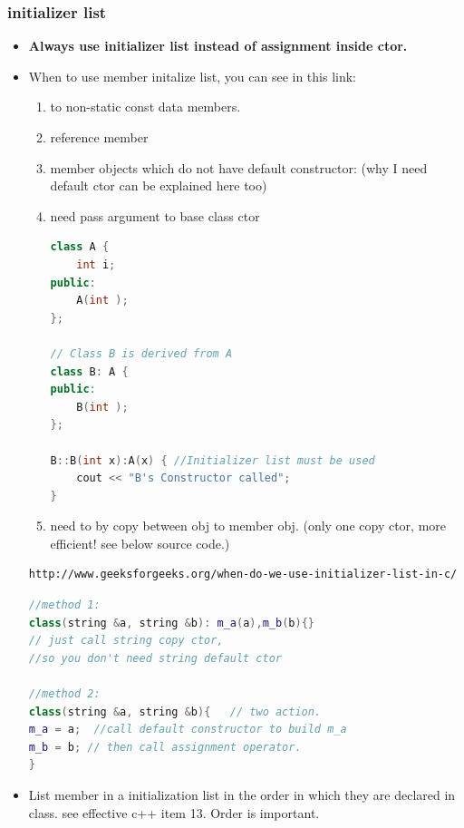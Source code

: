 \documentclass[a4paper,12pt,twoside]{book}
\begin{document}
\subsubsection{initializer list}
\begin{itemize}
\item \textbf{Always use initializer list instead of assignment inside ctor.}

\item When to use member initalize list, you can see in this link:
\begin{enumerate}
\item to non-static const data members.
\item reference member
\item  member objects which do not have default constructor: (why I need default ctor can be explained here too)
\item need pass argument to base class ctor
\begin{lstlisting}[frame=single, language=c++]
class A {
    int i;
public:
    A(int );
};

// Class B is derived from A
class B: A {
public:
    B(int );
};

B::B(int x):A(x) { //Initializer list must be used
    cout << "B's Constructor called";
}
\end{lstlisting}

\item need to by copy between obj to member obj. (only one copy ctor, more efficient! see below source code.)
\end{enumerate}

\begin{verbatim}
http://www.geeksforgeeks.org/when-do-we-use-initializer-list-in-c/
\end{verbatim}

\begin{lstlisting}[frame=single, language=c++]
//method 1:
class(string &a, string &b): m_a(a),m_b(b){}
// just call string copy ctor,
//so you don't need string default ctor

//method 2:
class(string &a, string &b){   // two action.
m_a = a;  //call default constructor to build m_a
m_b = b; // then call assignment operator.
}
\end{lstlisting}

\item List member in a initialization list in the order in which they are declared in class. see effective c++ item 13. Order is important.


\end{itemize}
\end{document}
